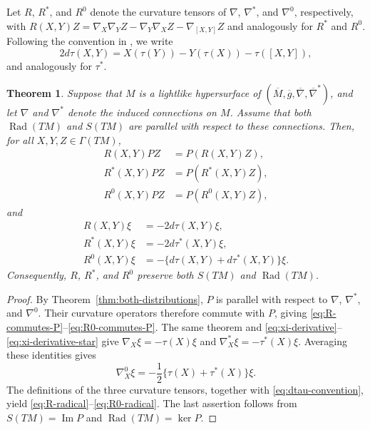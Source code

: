 \documentclass[11pt,a4paper]{article}
\newtheorem{theorem}{Theorem}[section]
\theoremstyle{remark}
\theoremstyle{definition}
\newcommand{\Rad}{\operatorname{Rad}}
\begin{document}
Let $R$, $R^{*}$, and $R^{0}$ denote the curvature tensors of
$\nabla$, $\nabla^{*}$, and $\nabla^{0}$, respectively, with
$R(X,Y)Z=\nabla_X\nabla_YZ-\nabla_Y\nabla_XZ-\nabla_{[X,Y]}Z$ and
analogously for $R^{*}$ and $R^{0}$. Following the convention in
\cite{BahadirTripathi2023}, we write
\begin{equation}\label{eq:dtau-convention}
2d\tau(X,Y)=X(\tau(Y))-Y(\tau(X))-\tau([X,Y]),
\end{equation}
and analogously for $\tau^{*}$.

\begin{theorem}\label{thm:curvature-preservation}
Suppose that $M$ is a lightlike hypersurface of
$(\overline{M},\overline{g},\overline{\nabla},\overline{\nabla}^{*})$, and
let $\nabla$ and $\nabla^{*}$ denote the induced connections on $M$.
Assume that both $\Rad(TM)$ and $S(TM)$ are parallel with respect to these
connections. Then, for all $X,Y,Z\in\Gamma(TM)$,
\begin{align}
R(X,Y)PZ&=P(R(X,Y)Z),\label{eq:R-commutes-P}\\
R^{*}(X,Y)PZ&=P(R^{*}(X,Y)Z),\label{eq:Rstar-commutes-P}\\
R^{0}(X,Y)PZ&=P(R^{0}(X,Y)Z),\label{eq:R0-commutes-P}
\end{align}
and
\begin{align}
R(X,Y)\xi&=-2d\tau(X,Y)\xi,\label{eq:R-radical}\\
R^{*}(X,Y)\xi&=-2d\tau^{*}(X,Y)\xi,\label{eq:Rstar-radical}\\
R^{0}(X,Y)\xi&=-\{d\tau(X,Y)+d\tau^{*}(X,Y)\}\xi.
\label{eq:R0-radical}
\end{align}
Consequently, $R$, $R^{*}$, and $R^{0}$ preserve both $S(TM)$ and
$\Rad(TM)$.
\end{theorem}

\begin{proof}
By Theorem~\ref{thm:both-distributions}, $P$ is parallel with respect to
$\nabla$, $\nabla^{*}$, and $\nabla^{0}$. Their curvature operators
therefore commute with $P$, giving
\eqref{eq:R-commutes-P}--\eqref{eq:R0-commutes-P}. The same theorem and
\eqref{eq:xi-derivative}--\eqref{eq:xi-derivative-star} give
$\nabla_X\xi=-\tau(X)\xi$ and
$\nabla_X^{*}\xi=-\tau^{*}(X)\xi$. Averaging these identities gives
\[
\nabla_X^{0}\xi=-\frac12\{\tau(X)+\tau^{*}(X)\}\xi.
\]
The definitions of the three curvature tensors, together with
\eqref{eq:dtau-convention}, yield
\eqref{eq:R-radical}--\eqref{eq:R0-radical}. The last assertion follows
from $S(TM)=\operatorname{Im}P$ and $\Rad(TM)=\ker P$.
\end{proof}
\end{document}
